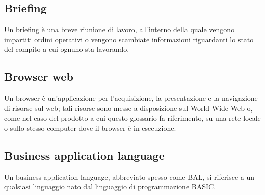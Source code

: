 \subsection*{Briefing}
Un briefing è una breve riunione di lavoro, all'interno della quale vengono impartiti ordini operativi o vengono scambiate informazioni riguardanti lo stato del compito a cui ognuno sta lavorando.

\subsection*{Browser web}
Un browser è un'applicazione per l'acquisizione, la presentazione e la navigazione di risorse sul web; tali risorse sono messe a disposizione sul World Wide Web o, come nel caso del prodotto a cui questo glossario fa riferimento, su una rete locale o sullo stesso computer dove il browser è in esecuzione.

\subsection*{Business application language}
Un business application language, abbreviato spesso come BAL, si riferisce a un qualsiasi linguaggio nato dal linguaggio di programmazione BASIC.


